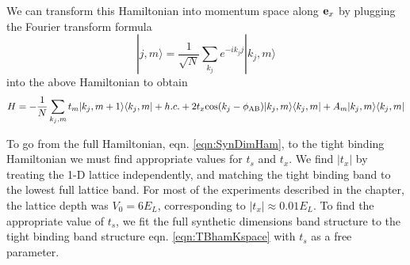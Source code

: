 We can transform this Hamiltonian into momentum space along ${\bf e}_x$ by plugging the Fourier transform formula 
\begin{equation}
|j,m\rangle = \frac{1}{\sqrt{N}}\sum_{k_j}e^{-ik_j j}|k_j,m\rangle
\end{equation}
into the above Hamiltonian to obtain 
\begin{equation}
H=-\frac{1}{N}\sum_{k_j,m}t_m|k_j,m+1\rangle\langle k_j,m| + h.c. +2t_x{\rm cos}(k_j-\phi_{\rm AB})|k_j,m\rangle\langle k_j,m| + A_m|k_j,m\rangle\langle k_j,m|
\label{eqn:TBhamKspace}
\end{equation}

To go from the full Hamiltonian, eqn. \ref{eqn:SynDimHam}, to the tight binding Hamiltonian we must find appropriate values for $t_s$ and $t_x$. We find $|t_x|$ by treating the 1-D lattice independently, and matching the tight binding band to the lowest full lattice band. For most of the experiments described in the chapter, the lattice depth was $V_0=6E_L$, corresponding to $|t_x|\approx0.01 E_L$. To find the appropriate value of $t_s$, we fit the full synthetic dimensions band structure to the tight binding band structure eqn. \ref{eqn:TBhamKspace} with $t_s$ as a free parameter. 

